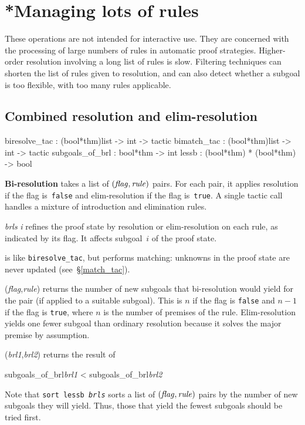 \section{*Managing lots of rules}
These operations are not intended for interactive use.  They are concerned
with the processing of large numbers of rules in automatic proof
strategies.  Higher-order resolution involving a long list of rules is
slow.  Filtering techniques can shorten the list of rules given to
resolution, and can also detect whether a subgoal is too flexible,
with too many rules applicable.

\subsection{Combined resolution and elim-resolution} \label{biresolve_tac}
\begin{ttbox} 
biresolve_tac   : (bool*thm)list -> int -> tactic
bimatch_tac     : (bool*thm)list -> int -> tactic
subgoals_of_brl : bool*thm -> int
lessb           : (bool*thm) * (bool*thm) -> bool
\end{ttbox}
{\bf Bi-resolution} takes a list of $\it (flag,rule)$ pairs.  For each
pair, it applies resolution if the flag is~{\tt false} and
elim-resolution if the flag is~{\tt true}.  A single tactic call handles a
mixture of introduction and elimination rules.

\begin{ttdescription}
\item[\ttindexbold{biresolve_tac} {\it brls} {\it i}] 
refines the proof state by resolution or elim-resolution on each rule, as
indicated by its flag.  It affects subgoal~$i$ of the proof state.

\item[\ttindexbold{bimatch_tac}] 
is like {\tt biresolve_tac}, but performs matching: unknowns in the
proof state are never updated (see~{\S}\ref{match_tac}).

\item[\ttindexbold{subgoals_of_brl}({\it flag},{\it rule})] 
returns the number of new subgoals that bi-res\-o\-lu\-tion would yield for the
pair (if applied to a suitable subgoal).  This is $n$ if the flag is
{\tt false} and $n-1$ if the flag is {\tt true}, where $n$ is the number
of premises of the rule.  Elim-resolution yields one fewer subgoal than
ordinary resolution because it solves the major premise by assumption.

\item[\ttindexbold{lessb} ({\it brl1},{\it brl2})] 
returns the result of 
\begin{ttbox}
subgoals_of_brl{\it brl1} < subgoals_of_brl{\it brl2}
\end{ttbox}
\end{ttdescription}
Note that \hbox{\tt sort lessb {\it brls}} sorts a list of $\it
(flag,rule)$ pairs by the number of new subgoals they will yield.  Thus,
those that yield the fewest subgoals should be tried first.


